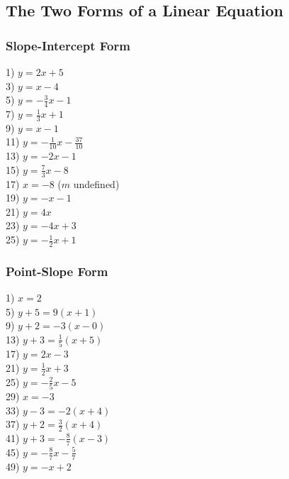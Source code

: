 \documentclass[12pt]{book}
\theoremstyle{definition}
\begin{document}
\subsection*{The Two Forms of a Linear Equation}
\subsubsection*{Slope-Intercept Form}
\begin{multicols}{3}
1) $y=2x+5$\\
3) $y=x-4$\\
5) $y=-\frac{3}{4}x-1$\\
7) $y=\frac{1}{3}x+1$\\
9) $y=x-1$\\
11) $y=-\frac{1}{10}x-\frac{37}{10}$\\
13) $y=-2x-1$\\
15) $y=\frac{7}{3}x-8$\\
17) $x=-8$ ($m$ undefined)\\
19) $y=-x-1$\\
21) $y=4x$\\
23) $y=-4x+3$\\
25) $y=-\frac{1}{2}x+1$
\end{multicols}
\subsubsection*{Point-Slope Form}
\begin{multicols}{3}
1) $x=2$\\
5) $y+5=9(x+1)$\\
9) $y+2=-3(x-0)$\\
13) $y+3=\frac{1}{5}(x+5)$\\
17) $y=2x-3$\\
21) $y=\frac{1}{2}x+3$\\
25) $y=-\frac{2}{5}x-5$\\
29) $x=-3$\\
33) $y-3=-2(x+4)$\\
37) $y+2=\frac{3}{2}(x+4)$\\
41) $y+3=-\frac{8}{7}(x-3)$\\
45) $y=-\frac{8}{7}x-\frac{5}{7}$\\
49) $y=-x+2$
\end{multicols}
\end{document}

